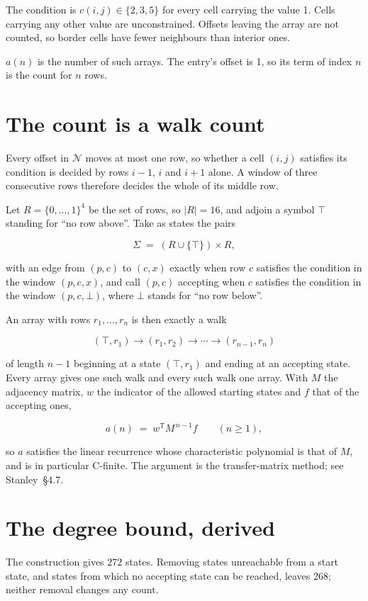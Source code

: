 \documentclass[11pt]{article}
\theoremstyle{definition}
\begin{document}
The condition is $c(i,j) \in \{2, 3, 5\}$ for every cell carrying the value 1. Cells carrying any other value are unconstrained. Offsets leaving the array are not counted, so border cells have fewer neighbours than interior ones.

$a(n)$ is the number of such arrays. The entry's offset is 1, so its term of index $n$ is the count for $n$ rows.

\section{The count is a walk count}

Every offset in $\mathcal{N}$ moves at most one row, so whether a cell $(i,j)$ satisfies its condition is decided by rows $i-1$, $i$ and $i+1$ alone. A window of three consecutive rows therefore decides the whole of its middle row.

Let $R = \{0,\dots,1\}^{4}$ be the set of rows, so $|R| = 16$, and adjoin a symbol $\top$ standing for ``no row above''. Take as states the pairs

\[\Sigma \;=\; (R \cup \{\top\}) \times R,\]

with an edge from $(p,c)$ to $(c,x)$ exactly when row $c$ satisfies the condition in the window $(p,c,x)$, and call $(p,c)$ accepting when $c$ satisfies the condition in the window $(p,c,\bot)$, where $\bot$ stands for ``no row below''.

An array with rows $r_1,\dots,r_n$ is then exactly a walk

\[(\top,r_1) \to (r_1,r_2) \to \cdots \to (r_{n-1},r_n)\]

of length $n-1$ beginning at a state $(\top,r_1)$ and ending at an accepting state. Every array gives one such walk and every such walk one array. With $M$ the adjacency matrix, $w$ the indicator of the allowed starting states and $f$ that of the accepting ones,

\[a(n) \;=\; w^{\mathsf T} M^{\,n-1} f \qquad (n \ge 1),\]

so $a$ satisfies the linear recurrence whose characteristic polynomial is that of $M$, and is in particular C-finite. The argument is the transfer-matrix method; see Stanley~\S4.7.

\section{The degree bound, derived}

The construction gives $272$ states. Removing states unreachable from a start state, and states from which no accepting state can be reached, leaves $268$; neither removal changes any count.
\end{document}
